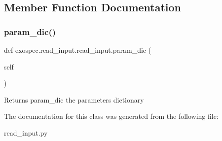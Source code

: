 \subsection{Member Function Documentation}
\mbox{\label{classexospec_1_1read__input_1_1read__input_a3b21e8723a95f914bb6c329ba68c3d86}} 
\subsubsection{\texorpdfstring{param\+\_\+dic()}{param\_dic()}}
{\footnotesize\ttfamily def exospec.\+read\+\_\+input.\+read\+\_\+input.\+param\+\_\+dic (\begin{DoxyParamCaption}\item[{}]{self }\end{DoxyParamCaption})}

\begin{DoxyReturn}{Returns}
param\+\_\+dic the parameters dictionary 
\end{DoxyReturn}


The documentation for this class was generated from the following file\+:\begin{DoxyCompactItemize}
\item 
read\+\_\+input.\+py\end{DoxyCompactItemize}
